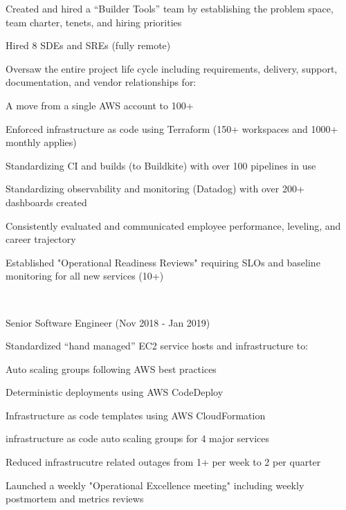 \documentclass[letterpaper]{resume}
\begin{document}
\begin{compactitem}

\item Created and hired a ``Builder Tools'' team by establishing the problem
    space, team charter, tenets, and hiring priorities
\item Hired 8 SDEs and SREs (fully remote)
\item Oversaw the entire project life cycle including requirements, delivery,
    support, documentation, and vendor relationships for:
    \begin{compactitem}
        \item A move from a single AWS account to 100+
        \item Enforced infrastructure as code using Terraform (150+ workspaces and 1000+ monthly applies)
        \item Standardizing CI and builds (to Buildkite) with over 100 pipelines in use
        \item Standardizing observability and monitoring (Datadog) with over 200+ dashboards created
    \end{compactitem}
\item Consistently evaluated and communicated employee performance,
    leveling, and career trajectory
\item Established "Operational Readiness Reviews" requiring SLOs and baseline
    monitoring for all new services (10+)

\end{compactitem}

~

Senior Software Engineer (Nov 2018 - Jan 2019)
\begin{compactitem}

\item Standardized ``hand managed'' EC2 service hosts and infrastructure to:
    \begin{compactitem}
    \item Auto scaling groups following AWS best practices
    \item Deterministic deployments using AWS CodeDeploy
    \item Infrastructure as code templates using AWS CloudFormation
    \end{compactitem}
    infrastructure as code auto scaling groups for 4 major services
\item Reduced infrastrucutre related outages from 1+ per week to 2 per quarter
\item Launched a weekly "Operational Excellence meeting" including weekly
    postmortem and metrics reviews

\end{compactitem}
\end{document}

